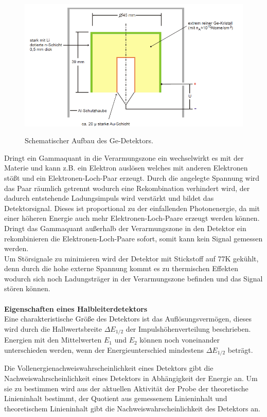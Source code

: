 \begin{figure}
  \centering
  \includegraphics[height=7cm]{Aufbau.png}
  \caption{Schematischer Aufbau des Ge-Detektors. \cite{skript}}
  \label{fig:Aufbau}
\end{figure}

Dringt ein Gammaquant in die Verarmungszone ein wechselwirkt es mit der Materie und kann
z.B. ein Elektron auslösen welches mit anderen Elektronen stößt und ein Elektronen-Loch-Paar erzeugt.
Durch die angelegte Spannung wird das Paar räumlich getrennt wodurch eine Rekombination verhindert wird,
der dadurch entstehende Ladungsimpuls
wird verstärkt und bildet das Detektorsignal. Dieses ist proportional zu der einfallenden Photonenergie, da mit
einer höheren Energie auch mehr Elektronen-Loch-Paare erzeugt werden können.
Dringt das Gammaquant außerhalb der Verarmungszone in den Detektor ein rekombinieren die
Elektronen-Loch-Paare sofort, somit kann kein Signal gemessen werden.\\
Um Störsignale zu minimieren wird der Detektor mit Stickstoff auf 77\;K gekühlt, denn durch die
hohe externe Spannung kommt es zu thermischen Effekten wodurch sich noch Ladungsträger in der Verarmungszone
befinden und das Signal stören können.
\\
\\
\textbf{Eigenschaften eines Halbleiterdetektors}\\
Eine charakteristische Größe des Detektors ist das Auflösungsvermögen, dieses wird durch die
Halbwertsbreite $\Delta E_{1/2}$ der Impulshöhenverteilung beschrieben. Energien mit den Mittelwerten
$E_1$ und $E_2$ können noch voneinander unterschieden werden, wenn der Energieunterschied mindestens
$\Delta E_{1/2}$ beträgt.

Die Vollenergienachweiswahrscheinlichkeit eines Detektors gibt die Nachweiswahrscheinlichkeit eines Detektors
in Abhängigkeit der Energie an. Um sie zu bestimmen wird aus der aktuellen Aktivität der Probe der
theoretische Linieninhalt bestimmt, der Quotient aus gemessenem Linieninhalt und theoretischem
Linieninhalt gibt die Nachweiswahrscheinlichkeit des Detektors an.

